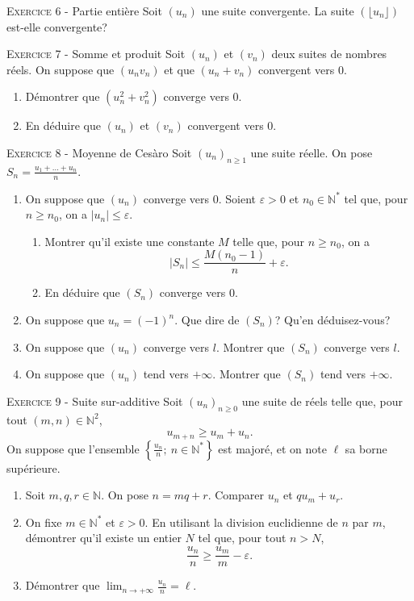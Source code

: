\documentclass[11pt]{article}
\newcommand{\veps}{\varepsilon}
\begin{document}


\vskip0.3cm\noindent\textsc{Exercice 6} - Partie entière
\vskip0.2cm
Soit $(u_n)$ une suite convergente.
La suite $(\lfloor u_n\rfloor)$ est-elle convergente?




\vskip0.3cm\noindent\textsc{Exercice 7} - Somme et produit
\vskip0.2cm
Soit $(u_n)$ et $(v_n)$ deux suites de nombres réels. On suppose que $(u_nv_n)$ et que $(u_n+v_n)$ convergent vers $0$. 
\begin{enumerate}
 \item Démontrer que $(u_n^2+v_n^2)$ converge vers $0$.
 \item En déduire que $(u_n)$ et $(v_n)$ convergent vers $0$.
\end{enumerate}




\vskip0.3cm\noindent\textsc{Exercice 8} - Moyenne de Ces\`aro
\vskip0.2cm
Soit $(u_n)_{n\geq 1}$ une suite réelle. On pose $S_n=\frac{u_1+\dots+u_n}{n}$.
\begin{enumerate}
\item On suppose que $(u_n)$ converge vers 0. Soient $\veps>0$ et $n_0\in\mathbb N^*$ tel que, pour
$n\geq n_0$, on a $|u_n|\leq\veps$.
\begin{enumerate}
\item Montrer qu'il existe une constante $M$ telle que, pour $n\geq n_0$, on a 
$$|S_n|\leq \frac{M(n_0-1)}{n}+\veps.$$
\item En déduire que $(S_n)$ converge vers 0.
\end{enumerate}
\item On suppose que $u_n=(-1)^n$. Que dire de $(S_n)$? Qu'en déduisez-vous?
\item On suppose que $(u_n)$ converge vers $l$. Montrer que $(S_n)$ converge vers $l$.
\item On suppose que $(u_n)$ tend vers $+\infty$. Montrer que $(S_n)$ tend vers $+\infty$.
\end{enumerate}




\vskip0.3cm\noindent\textsc{Exercice 9} - Suite sur-additive
\vskip0.2cm
Soit $(u_n)_{n\geq 0}$ une suite de réels telle que, pour tout $(m,n)\in\mathbb N^2$, 
$$u_{m+n}\geq u_m+u_n.$$
On suppose que l'ensemble $\left\{\frac{u_n}n;\ n\in\mathbb N^*\right\}$ est majoré, et on note $\ell$ sa borne supérieure.
\begin{enumerate}
\item Soit $m,q,r\in \mathbb N$. On pose $n=mq+r$. Comparer $u_n$ et $qu_m+u_r$.
\item On fixe $m\in\mathbb N^*$ et $\veps>0$. En utilisant la division euclidienne de $n$ par $m$, démontrer qu'il existe un entier $N$ tel que, pour tout $n>N$, 
$$\frac{u_n}n\geq\frac{u_m}m-\veps.$$
\item Démontrer que $\lim_{n\to+\infty}\frac{u_n}n=\ell$.
\end{enumerate}
\end{document}
